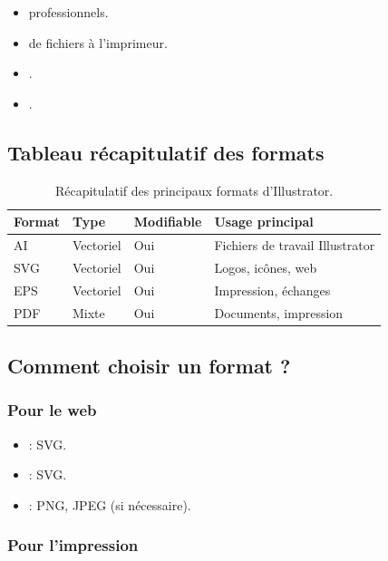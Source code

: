 \begin{itemize}
    \item {} professionnels.
    \item {} de fichiers à l'imprimeur.
    \item {}.
    \item {}.
\end{itemize}

\subsection{Tableau récapitulatif des formats}

\begin{table}[h!]
\centering
\begin{tabular}{@{}p{2cm}p{3cm}p{2cm}p{4.5cm}@{}}
\toprule
\textbf{Format} & \textbf{Type} & \textbf{Modifiable} & \textbf{Usage principal} \\
\midrule
AI & Vectoriel & Oui & Fichiers de travail Illustrator \\
SVG & Vectoriel & Oui & Logos, icônes, web \\
EPS & Vectoriel & Oui & Impression, échanges \\
PDF & Mixte & Oui & Documents, impression \\
\bottomrule
\end{tabular}
\caption{Récapitulatif des principaux formats d'Illustrator.}
\end{table}

\subsection{Comment choisir un format ?}

\subsubsection{Pour le web}

\begin{itemize}
    \item {} : SVG.
    \item {} : SVG.
    \item {} : PNG, JPEG (si nécessaire).
\end{itemize}

\subsubsection{Pour l'impression}

